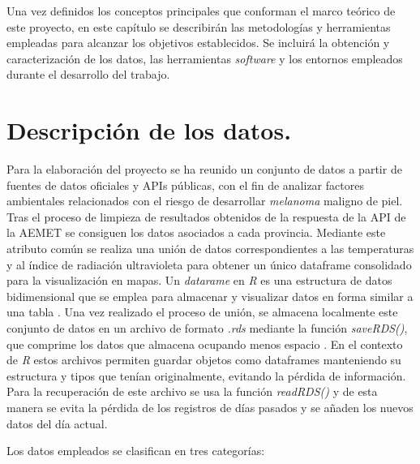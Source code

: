 Una vez definidos los conceptos principales que conforman el marco teórico de este proyecto, en este capítulo se describirán las metodologías y herramientas empleadas para alcanzar los objetivos establecidos. Se incluirá la obtención y caracterización de los datos, las herramientas \textit{software} y los entornos empleados durante el desarrollo del trabajo.



\section{Descripción de los datos.}
Para la elaboración del proyecto se ha reunido un conjunto de datos a partir de fuentes de datos oficiales y APIs públicas, con el fin de analizar factores ambientales relacionados con el riesgo de desarrollar \textit{melanoma} maligno de piel.
Tras el proceso de limpieza de resultados obtenidos de la respuesta de la API de la AEMET se consiguen los datos asociados a cada provincia. Mediante este atributo común se realiza una unión de datos correspondientes a las temperaturas y al índice de radiación ultravioleta para obtener un único dataframe consolidado para la visualización en mapas. Un \textit{datarame}  en \textit{R} es una estructura de datos bidimensional que se emplea para almacenar y visualizar datos en forma similar a una tabla \cite{gonzalez-vidalTabularColaTabulacionDatos2019}. Una vez realizado el proceso de unión, se almacena localmente este conjunto de datos en un archivo de formato \textit{.rds} mediante la función \textit{saveRDS()}, que comprime los datos que almacena ocupando menos espacio \cite{RParaPrincipiantes}. En el contexto de \textit{R} estos archivos permiten guardar objetos como dataframes manteniendo su estructura y tipos que tenían originalmente, evitando la pérdida de información. Para la recuperación de este archivo se usa la función \textit{readRDS()} y de esta manera se evita la pérdida de los registros de días pasados y se añaden los nuevos datos del día actual. 

Los datos empleados se clasifican en  tres categorías:

